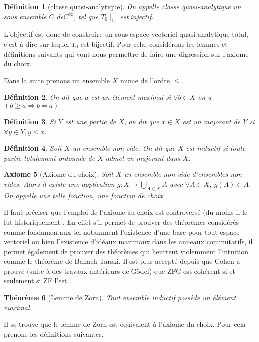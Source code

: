 \documentclass[12pt,a4paper]{amsart}
\newtheorem{thm}{\bf Th\'eor\`eme}
\newtheorem{defn}[thm]{\bf D\'efinition}
\newtheorem{axi}[thm]{\bf Axiome}
\begin{document}
\begin{defn}[classe quasi-analytique]
On appelle classe quasi-analytique un sous ensemble $C$ de$C^{\infty}$, tel que $T_{0}\mid_{C}$ est injectif. 
\end{defn}
L'objectif est donc de construire un sous-espace vectoriel quasi analytique total, c'est à dire sur lequel $T_{0}$ est bijectif. Pour cela, considérons les lemmes et définitions suivants qui vont nous permettre de faire une digression sur l'axiome du choix. 

Dans la suite prenons un ensemble $X$ munie de l'ordre $\leq$. 

\begin{defn}
On dit que $a$ est un élément maximal si $\forall b \in X$ 
on a $(b \geq a \Rightarrow b=a)$
\end{defn}

\begin{defn}
Si $Y$ est une partie de $X$, on dit que $x\in X$ est un majorant de $Y$ si $\forall y \in Y, y\leq x$. 
\end{defn}

\begin{defn}
Soit $X$ un ensemble non vide. On dit que $X$ est inductif si toute partie totalement ordonnée de $X$ admet un majorant dans $X$. 
\end{defn}

\begin{axi}[Axiome du choix]
Soit $X$ un ensemble non vide d'ensembles non vides. Alors il existe une application $ g : X \rightarrow \bigcup_{A\in X} A$ avec $\forall A \in X$, $g(A) \in A$. On appelle une telle fonction, une fonction de choix.  
\end{axi}

Il faut préciser que l'emploi de l'axiome du choix est controversé (du moins il le fut historiquement \cite{AC}. En effet s'il permet de prouver des théorèmes considérés comme fondamentaux tel notamment l'existence d'une base pour tout espace vectoriel ou bien l'existence d'idéaux maximaux dans les anneaux commutatifs, il permet également de prouver des théorèmes qui heurtent violemment l'intuition comme le théorème de Banach-Tarski. Il est plus accepté depuis que Cohen a prouvé (suite à des travaux antérieurs de Gödel) que ZFC est cohérent si et seulement si ZF l'est \cite{AC}. 
\begin{thm}[Lemme de Zorn]
Tout ensemble inductif possède un élément maximal. 
\end{thm}

Il se trouve que le lemme de Zorn est équivalent à l'axiome du choix. Pour cela prenons les définitions suivantes.
\end{document}
